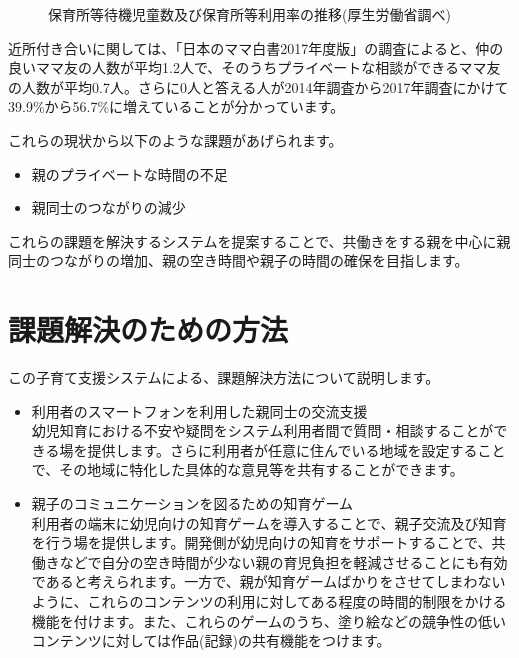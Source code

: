\documentclass[a4j]{jarticle}
\begin{document}
\begin{figure}[H]
\begin{center}
\caption{保育所等待機児童数及び保育所等利用率の推移(厚生労働省調べ)}
\label{fig:2}
\end{center}
\end{figure}

近所付き合いに関しては、「日本のママ白書2017年度版」の調査によると、仲の良いママ友の人数が平均1.2人で、そのうちプライベートな相談ができるママ友の人数が平均0.7人。さらに0人と答える人が2014年調査から2017年調査にかけて39.9\%から56.7\%に増えていることが分かっています\cite{bib:mama}。

これらの現状から以下のような課題があげられます。

\begin{itemize}
\item 親のプライベートな時間の不足
\item 親同士のつながりの減少
\end{itemize}

これらの課題を解決するシステムを提案することで、共働きをする親を中心に親同士のつながりの増加、親の空き時間や親子の時間の確保を目指します。


\section{課題解決のための方法}
この子育て支援システムによる、課題解決方法について説明します。
\begin{itemize}
  \item 利用者のスマートフォンを利用した親同士の交流支援 ~\\
    幼児知育における不安や疑問をシステム利用者間で質問・相談することができる場を提供します。さらに利用者が任意に住んでいる地域を設定することで、その地域に特化した具体的な意見等を共有することができます。
  \item 親子のコミュニケーションを図るための知育ゲーム ~\\
    利用者の端末に幼児向けの知育ゲームを導入することで、親子交流及び知育を行う場を提供します。開発側が幼児向けの知育をサポートすることで、共働きなどで自分の空き時間が少ない親の育児負担を軽減させることにも有効であると考えられます。一方で、親が知育ゲームばかりをさせてしまわないように、これらのコンテンツの利用に対してある程度の時間的制限をかける機能を付けます。また、これらのゲームのうち、塗り絵などの競争性の低いコンテンツに対しては作品(記録)の共有機能をつけます。
\end{itemize}
\end{document}
